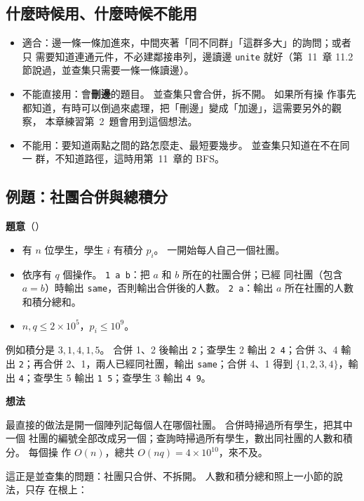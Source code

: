 \subsection{什麼時候用、什麼時候不能用}

\begin{itemize}
\item 適合：邊一條一條加進來，中間夾著「同不同群」「這群多大」的詢問；或者只
需要知道連通元件，不必建鄰接串列，邊讀邊 \texttt{unite} 就好（第~11~章 11.2
節說過，並查集只需要一條一條讀邊）。
\item 不能直接用：會\textbf{刪邊}的題目。 並查集只會合併，拆不開。 如果所有操
作事先都知道，有時可以倒過來處理，把「刪邊」變成「加邊」，這需要另外的觀察，
本章練習第~2~題會用到這個想法。
\item 不能用：要知道兩點之間的路怎麼走、最短要幾步。 並查集只知道在不在同一
群，不知道路徑，這時用第~11~章的 BFS。
\end{itemize}

\subsection{例題：社團合併與總積分}
\label{sec:ex-club}

\textbf{題意}（）

\begin{itemize}
\item 有 $n$ 位學生，學生 $i$ 有積分 $p_i$。 一開始每人自己一個社團。
\item 依序有 $q$ 個操作。 \texttt{1 a b}：把 $a$ 和 $b$ 所在的社團合併；已經
同社團（包含 $a = b$）時輸出 \texttt{same}，否則輸出合併後的人數。
\texttt{2 a}：輸出 $a$ 所在社團的人數和積分總和。
\item $n, q \le 2 \times 10^5$，$p_i \le 10^9$。
\end{itemize}

例如積分是 $3, 1, 4, 1, 5$。 合併 1、2 後輸出 \texttt{2}；查學生 2 輸出
\texttt{2 4}；合併 3、4 輸出 \texttt{2}；再合併 2、1，兩人已經同社團，輸出
\texttt{same}；合併 4、1 得到 $\{1, 2, 3, 4\}$，輸出 \texttt{4}；查學生 5 輸出
\texttt{1 5}；查學生 3 輸出 \texttt{4 9}。

\textbf{想法}

最直接的做法是開一個陣列記每個人在哪個社團。 合併時掃過所有學生，把其中一個
社團的編號全部改成另一個；查詢時掃過所有學生，數出同社團的人數和積分。 每個操
作 $O(n)$，總共 $O(nq) = 4 \times 10^{10}$，來不及。

這正是並查集的問題：社團只合併、不拆開。 人數和積分總和照上一小節的說法，只存
在根上：

